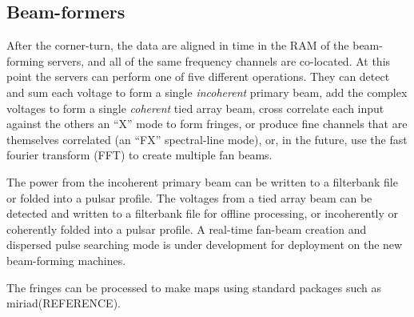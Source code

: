 \subsection{Beam-formers}

After the corner-turn, the data are aligned in time in the RAM of the beam-forming servers, and all of the same frequency channels are co-located. At this point the servers can perform one of five different operations. They can detect and sum each voltage to form a single \textit{incoherent} primary beam, add the complex voltages to form a single \textit{coherent} tied array beam, cross correlate each input against the others an ``X'' mode to form fringes, or produce fine channels that are themselves correlated (an ``FX'' spectral-line mode), or, in the future, use the fast fourier transform (FFT) to create multiple fan beams. 

The power from the incoherent primary beam can be written to a filterbank file or folded into a pulsar profile. The voltages from a tied array beam can be detected and written to a filterbank file for offline processing, or incoherently or coherently folded into a pulsar profile. A real-time fan-beam creation and dispersed pulse searching mode is under development for deployment on the new beam-forming machines.

The fringes can be processed to make maps using standard packages such as miriad(REFERENCE).